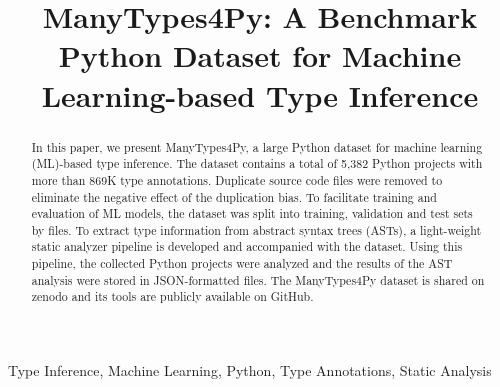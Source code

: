 \documentclass[10pt, conference]{IEEEtran}
\begin{document}
\title{ManyTypes4Py: A Benchmark Python Dataset for Machine Learning-based Type Inference\\
}

\author{
\and
{}
\and
{}
}

\maketitle

\begin{abstract}
In this paper, we present ManyTypes4Py, a large Python dataset for machine learning (ML)-based type inference. The dataset contains a total of 5,382 Python projects with more than 869K type annotations. Duplicate source code files were removed to eliminate the negative effect of the duplication bias. To facilitate training and evaluation of ML models, the dataset was split into training, validation and test sets by files. To extract type information from abstract syntax trees (ASTs), a light-weight static analyzer pipeline is developed and accompanied with the dataset. Using this pipeline, the collected Python projects were analyzed and the results of the AST analysis were stored in JSON-formatted files. The ManyTypes4Py dataset is shared on zenodo and its tools are publicly available on GitHub.
\end{abstract}

\begin{IEEEkeywords}
Type Inference, Machine Learning, Python, Type Annotations, Static Analysis
\end{IEEEkeywords}
\end{document}
